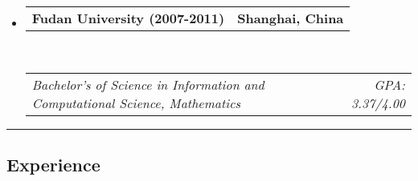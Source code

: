 \documentclass[10pt,letterpaper]{article}
\makeatletter
\newcommand{\headerrow}[2]
{\vspace{-0.05in}\begin{tabular*}{\linewidth}{l@{\extracolsep{\fill}}r}
    #1 &
    #2 \\
\end{tabular*}}
\makeatother
\begin{document}
\begin{itemize}
\item[]
    \headerrow
        {\textbf{Fudan University (2007-2011)}}
        {\textbf{Shanghai, China}}
    \\
    \headerrow
        {\emph{Bachelor's of Science in Information and Computational Science, Mathematics}}
        {\emph{GPA: 3.37/4.00}}


\end{itemize}
\hrule
\vspace{-0.75em}
\subsection*{Experience}
\end{document}
